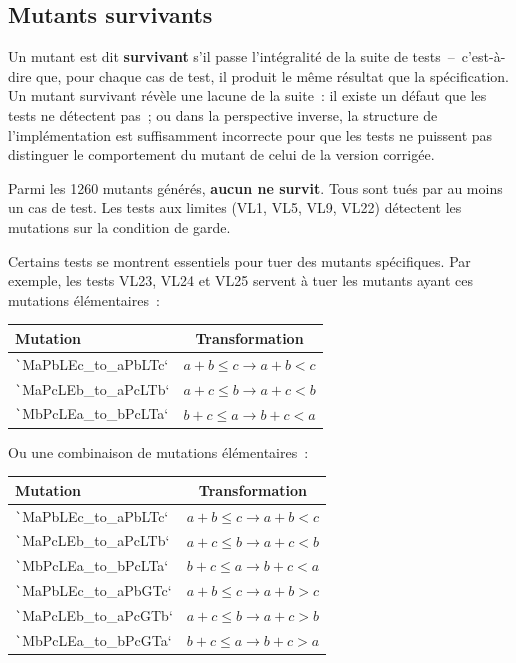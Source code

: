 \documentclass[a4paper,11pt]{article}
\begin{document}
\subsection{Mutants survivants}

Un mutant est dit \textbf{survivant} s'il passe l'intégralité de la suite de tests~--~c'est-à-dire que, pour chaque cas de test, il produit le même résultat que la spécification. Un mutant survivant révèle une lacune de la suite~: il existe un défaut que les tests ne détectent pas~; ou dans la perspective inverse, la structure de l'implémentation est suffisamment incorrecte pour que les tests ne puissent pas distinguer le comportement du mutant de celui de la version corrigée.

Parmi les 1260 mutants générés, \textbf{aucun ne survit}. Tous sont tués par au moins un cas de test. Les tests aux limites (VL1, VL5, VL9, VL22) détectent les mutations sur la condition de garde.

Certains tests se montrent essentiels pour tuer des mutants spécifiques. Par exemple, les tests VL23, VL24 et VL25 servent à tuer les mutants ayant ces mutations élémentaires~:

\begin{center}
\begin{tabular}{|l|c|}
    \hline
    \bf Mutation & \bf Transformation \\
    \hline
    \hline
    \texttt`MaPbLEc_to_aPbLTc` & $a + b \le c \to a + b < c$\\
    \hline
    \texttt`MaPcLEb_to_aPcLTb` & $a + c \le b \to a + c < b$\\
    \hline
    \texttt`MbPcLEa_to_bPcLTa` & $b + c \le a \to b + c < a$\\
    \hline
\end{tabular}
\end{center}

Ou une combinaison de mutations élémentaires~:

\begin{center}
\begin{tabular}{|l|c|}
    \hline
    \bf Mutation & \bf Transformation \\
    \hline
    \hline
    \texttt`MaPbLEc_to_aPbLTc` & $a + b \le c \to a + b < c$\\
    \hline
    \texttt`MaPcLEb_to_aPcLTb` & $a + c \le b \to a + c < b$\\
    \hline
    \texttt`MbPcLEa_to_bPcLTa` & $b + c \le a \to b + c < a$\\
    \hline
    \texttt`MaPbLEc_to_aPbGTc` & $a + b \le c \to a + b > c$\\
    \hline
    \texttt`MaPcLEb_to_aPcGTb` & $a + c \le b \to a + c > b$\\
    \hline
    \texttt`MbPcLEa_to_bPcGTa` & $b + c \le a \to b + c > a$\\
    \hline
\end{tabular}
\end{center}
\end{document}
